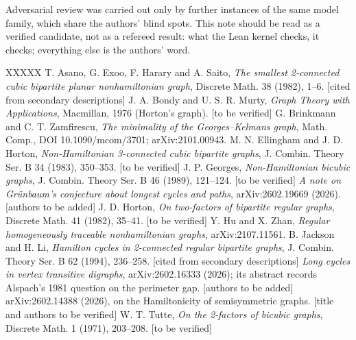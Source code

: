 \documentclass[11pt,a4paper]{article}
\theoremstyle{named}
\begin{document}
Adversarial review was carried out only by further instances of the same model family, which share the authors' blind spots. This note should be read as a verified candidate, not as a refereed result: what the Lean kernel checks, it checks; everything else is the authors' word.

\begin{thebibliography}{XXXXX}
 T. Asano, G. Exoo, F. Harary and A. Saito, \textit{The smallest 2-connected cubic bipartite planar nonhamiltonian graph}, Discrete Math. 38 (1982), 1–6. [cited from secondary descriptions]
 J. A. Bondy and U. S. R. Murty, \textit{Graph Theory with Applications}, Macmillan, 1976 (Horton's graph). [to be verified]
 G. Brinkmann and C. T. Zamfirescu, \textit{The minimality of the Georges–Kelmans graph}, Math. Comp., DOI 10.1090/mcom/3701; arXiv:2101.00943.
 M. N. Ellingham and J. D. Horton, \textit{Non-Hamiltonian 3-connected cubic bipartite graphs}, J. Combin. Theory Ser. B 34 (1983), 350–353. [to be verified]
 J. P. Georges, \textit{Non-Hamiltonian bicubic graphs}, J. Combin. Theory Ser. B 46 (1989), 121–124. [to be verified]
 \textit{A note on Grünbaum's conjecture about longest cycles and paths}, arXiv:2602.19669 (2026). [authors to be added]
 J. D. Horton, \textit{On two-factors of bipartite regular graphs}, Discrete Math. 41 (1982), 35–41. [to be verified]
 Y. Hu and X. Zhan, \textit{Regular homogeneously traceable nonhamiltonian graphs}, arXiv:2107.11561.
 B. Jackson and H. Li, \textit{Hamilton cycles in 2-connected regular bipartite graphs}, J. Combin. Theory Ser. B 62 (1994), 236–258. [cited from secondary descriptions]
 \textit{Long cycles in vertex transitive digraphs}, arXiv:2602.16333 (2026); its abstract records Alspach's 1981 question on the perimeter gap. [authors to be added]
 arXiv:2602.14388 (2026), on the Hamiltonicity of semisymmetric graphs. [title and authors to be verified]
 W. T. Tutte, \textit{On the 2-factors of bicubic graphs}, Discrete Math. 1 (1971), 203–208. [to be verified]
\end{thebibliography}
\end{document}
